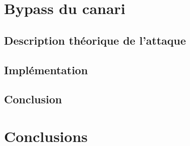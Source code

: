 \section{Bypass du canari}

\subsection{Description théorique de l'attaque}
\subsection{Implémentation}
\subsection{Conclusion}


\section{Conclusions}
